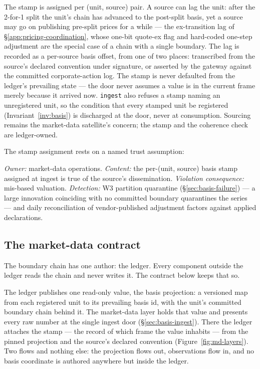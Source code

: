 \noindent
The stamp is assigned per (unit, source) pair. A source can lag the unit: after
the 2-for-1 split the unit's chain has advanced to the post-split basis, yet a
source may go on publishing pre-split prices for a while --- the ex-transition
lag of \S\ref{app:pricing-coordination}, whose one-bit quote-ex flag and
hard-coded one-step adjustment are the special case of a chain with a single
boundary. The lag is recorded as a per-source
basis offset, from one of two places: transcribed from
the source's declared convention under signature, or asserted by the gateway
against the committed corporate-action log. The stamp is never defaulted from
the ledger's prevailing state --- the door never assumes a value is in the
current frame merely because it arrived now. \texttt{ingest} also refuses a
stamp naming an unregistered unit, so the condition that every stamped unit be
registered (Invariant~\ref{inv:basis}) is discharged at the door, never at
consumption. Sourcing remains the
market-data satellite's concern; the stamp and the coherence check are
ledger-owned.

The stamp assignment rests on a named trust assumption:

\begin{description}[style=nextline]
\item[TA-BASIS.] \emph{Owner:} market-data operations. \emph{Content:} the per-(unit,
source) basis stamp assigned at ingest is true of the source's dissemination.
\emph{Violation consequence:} mis-based valuation. \emph{Detection:} W3 partition
quarantine (\S\ref{sec:basis-failure}) --- a large innovation coinciding with no
committed boundary quarantines the series --- and daily reconciliation of
vendor-published adjustment factors against applied declarations.
\end{description}

\subsection{The market-data contract}
\label{sec:basis-contract}

The boundary chain has one author: the ledger. Every component outside the
ledger reads the chain and never writes it. The contract below keeps that so.

The ledger publishes one read-only value, the basis projection: a versioned
map from each registered unit to its prevailing basis id, with the unit's
committed boundary chain behind it. The market-data layer holds that value and
presents every raw number at the single ingest door
(\S\ref{sec:basis-ingest}). There the ledger attaches the stamp --- the record
of which frame the value inhabits --- from the pinned projection and the
source's declared convention (Figure~\ref{fig:md-layers}). Two flows and
nothing else: the projection flows out, observations flow in, and no basis
coordinate is authored anywhere but inside the ledger.

